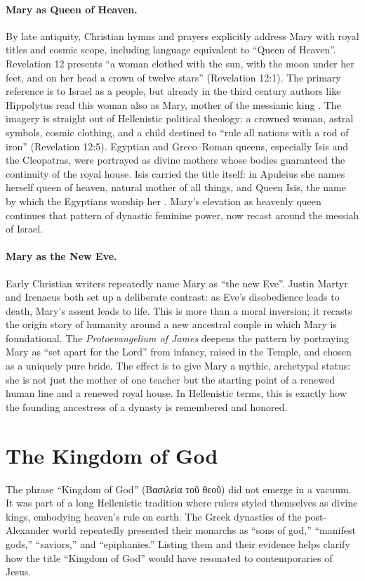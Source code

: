 \paragraph{Mary as Queen of Heaven.}
By late antiquity, Christian hymns and prayers explicitly address Mary with royal titles and cosmic scope, including language equivalent to ``Queen of Heaven''.
Revelation 12 presents ``a woman clothed with the sun, with the moon under her feet, and on her head a crown of twelve stars'' (Revelation 12:1).
The primary reference is to Israel as a people, but already in the third century authors like Hippolytus read this woman also as Mary, mother of the messianic king \cite{hippolytus:daniel}.
The imagery is straight out of Hellenistic political theology: a crowned woman, astral symbols, cosmic clothing, and a child destined to ``rule all nations with a rod of iron'' (Revelation 12:5).
Egyptian and Greco--Roman queens, especially Isis and the Cleopatras, were portrayed as divine mothers whose bodies guaranteed the continuity of the royal house.
Isis carried the title itself: in Apuleius she names herself queen of heaven, natural mother of all things, and Queen Isis, the name by which the Egyptians worship her \cite[11.5]{apuleius:metamorphoses}.
Mary's elevation as heavenly queen continues that pattern of dynastic feminine power, now recast around the messiah of Israel.

\paragraph{Mary as the New Eve.}
Early Christian writers repeatedly name Mary as ``the new Eve''.
Justin Martyr \cite[100]{justinmartyr:trypho} and Irenaeus \cite[3.22.4]{irenaeus:advhaer} both set up a deliberate contrast: as Eve's disobedience leads to death, Mary's assent leads to life.
This is more than a moral inversion; it recasts the origin story of humanity around a new ancestral couple in which Mary is foundational.
The \emph{Protoevangelium of James} \cite[4--8]{protoevangelium} deepens the pattern by portraying Mary as ``set apart for the Lord'' from infancy, raised in the Temple, and chosen as a uniquely pure bride.
The effect is to give Mary a mythic, archetypal status: she is not just the mother of one teacher but the starting point of a renewed human line and a renewed royal house.
In Hellenistic terms, this is exactly how the founding ancestress of a dynasty is remembered and honored.

\section{The Kingdom of God}\label{sec:the-kingdom-of-god}
The phrase “Kingdom of God” (\textgreek{Βασιλεία τοῦ θεοῦ}) did not emerge in a vacuum.
It was part of a long Hellenistic tradition where rulers styled themselves as divine kings, embodying heaven’s rule on earth.
The Greek dynasties of the post-Alexander world repeatedly presented their monarchs as “sons of god,” “manifest gods,” “saviors,” and “epiphanies.”
Listing them and their evidence helps clarify how the title “Kingdom of God” would have resonated to contemporaries of Jesus.

